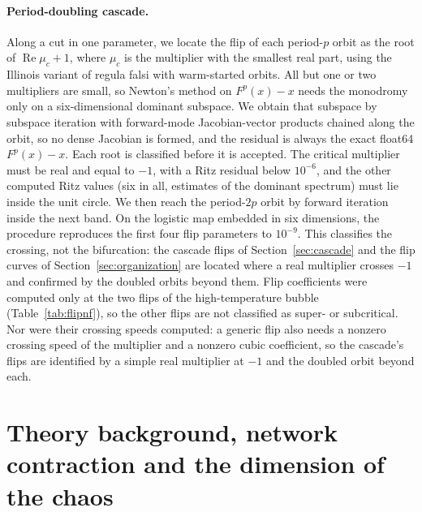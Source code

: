\documentclass[11pt,letterpaper]{article}
\begin{document}
\paragraph{Period-doubling cascade.} Along a cut in one parameter, we locate the flip of each period-$p$ orbit as the
root of $\operatorname{Re}\mu_c+1$, where $\mu_c$ is the multiplier with the smallest real part, using the Illinois
variant of regula falsi with warm-started orbits. All but one or two multipliers are small, so Newton's method on
$F^p(x)-x$ needs the monodromy only on a six-dimensional dominant subspace. We obtain that subspace by subspace
iteration with forward-mode Jacobian-vector products chained along the orbit, so no dense Jacobian is formed,
and the residual is always the exact float64 $F^p(x)-x$. Each root is classified before it is accepted. The critical
multiplier must be real and equal to $-1$, with a Ritz residual below $10^{-6}$, and the other computed Ritz values
(six in all, estimates of the dominant spectrum) must lie inside the unit circle. We then reach the period-$2p$ orbit
by forward iteration inside the next band. On the logistic map embedded in six dimensions, the procedure reproduces
the first four flip parameters to $10^{-9}$. This classifies the crossing, not the bifurcation: the cascade flips of
Section~\ref{sec:cascade} and the flip curves of Section~\ref{sec:organization} are located where a real multiplier
crosses $-1$ and confirmed by the doubled orbits beyond them. Flip coefficients were computed only at the two flips of
the high-temperature bubble (Table~\ref{tab:flipnf}), so the other flips are not classified as super- or subcritical. Nor were their crossing speeds computed: a generic
flip also needs a nonzero crossing speed of the multiplier and a nonzero cubic coefficient, so the cascade's flips are
identified by a simple real multiplier at $-1$ and the doubled orbit beyond each.

\FloatBarrier
\section{Theory background, network contraction and the dimension of the chaos}
\label{sec:theorymore}

\end{document}
